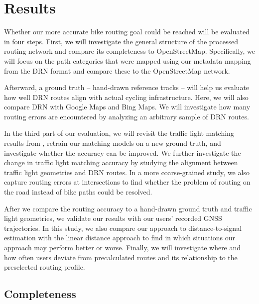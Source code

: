 \section{Results}

Whether our more accurate bike routing goal could be reached will be evaluated in four steps. First, we will investigate the general structure of the processed routing network and compare its completeness to OpenStreetMap. Specifically, we will focus on the path categories that were mapped using our metadata mapping from the DRN format and compare these to the OpenStreetMap network. 

Afterward, a ground truth -- hand-drawn reference tracks -- will help us evaluate how well DRN routes align with actual cycling infrastructure. Here, we will also compare DRN with Google Maps and Bing Maps. We will investigate how many routing errors are encountered by analyzing an arbitrary sample of DRN routes.

In the third part of our evaluation, we will revisit the traffic light matching results from , retrain our matching models on a new ground truth, and investigate whether the accuracy can be improved. We further investigate the change in traffic light matching accuracy by studying the alignment between traffic light geometries and DRN routes. In a more coarse-grained study, we also capture routing errors at intersections to find whether the problem of routing on the road instead of bike paths could be resolved. 

After we compare the routing accuracy to a hand-drawn ground truth and traffic light geometries, we validate our results with our users' recorded GNSS trajectories. In this study, we also compare our approach to distance-to-signal estimation with the linear distance approach to find in which situations our approach may perform better or worse. Finally, we will investigate where and how often users deviate from precalculated routes and its relationship to the preselected routing profile.

\subsection{Completeness}\label{sec:lorenz2}

